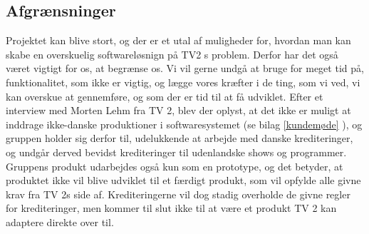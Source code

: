 \subsection{Afgrænsninger}
Projektet kan blive stort, og der er et utal af muligheder for, hvordan man kan skabe en overskuelig softwareløsnign på TV2 s problem. Derfor har det også været vigtigt for os, at begrænse os. Vi vil gerne undgå at bruge for meget tid på, funktionalitet, som ikke er vigtig, og lægge vores kræfter i de ting, som vi ved, vi kan overskue at gennemføre, og som der er tid til at få udviklet. Efter et interview med Morten Lehm fra TV 2, blev der oplyst, at det ikke er muligt at inddrage ikke-danske produktioner i softwaresystemet (se bilag \ref{kundemøde} ), og gruppen holder sig derfor til, udelukkende at arbejde med danske krediteringer, og undgår derved bevidst krediteringer til udenlandske shows og programmer.
Gruppens produkt udarbejdes også kun som en prototype, og det betyder, at produktet ikke vil blive udviklet til et færdigt produkt, som vil opfylde alle givne krav fra TV 2s side af. Krediteringerne vil dog stadig overholde de givne regler for krediteringer, men kommer til slut ikke til at være et produkt TV 2 kan adaptere direkte over til. 
